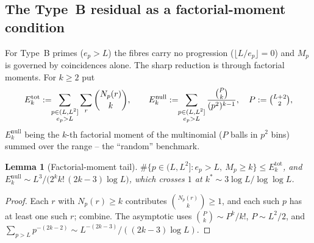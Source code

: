 \documentclass[11pt]{article}
\theoremstyle{plain}
\newtheorem{lemma}[theorem]{Lemma}
\theoremstyle{definition}
\theoremstyle{remark}
\newcommand{\ep}{e_p}
\begin{document}
\subsection{The Type~B residual as a factorial-moment condition}\label{sec:typeB}

For Type~B primes ($\ep>L$) the fibres carry no progression
($\lfloor L/\ep\rfloor=0$) and $M_p$ is governed by coincidences alone. The sharp
reduction is through factorial moments. For $k\ge2$ put
\[
E_k^{\mathrm{tot}}:=\!\!\sum_{\substack{p\in(L,L^2]\\ \ep>L}}\sum_r\binom{N_p(r)}{k},
\qquad
E_k^{\mathrm{null}}:=\!\!\sum_{\substack{p\in(L,L^2]\\ \ep>L}}\frac{\binom{P}{k}}{(p^2)^{k-1}},
\quad P:=\tbinom{L+2}{2},
\]
$E_k^{\mathrm{null}}$ being the $k$-th factorial moment of the multinomial ($P$
balls in $p^2$ bins) summed over the range -- the ``random'' benchmark.

\begin{lemma}[Factorial-moment tail]\label{lem:markov}
$\#\{p\in(L,L^2]:\ep>L,\ M_p\ge k\}\le E_k^{\mathrm{tot}}$, and
$E_k^{\mathrm{null}}\sim L^3/\bigl(2^kk!\,(2k-3)\log L\bigr)$, which crosses $1$ at
$k^\ast\sim3\log L/\log\log L$.
\end{lemma}
\begin{proof}
Each $r$ with $N_p(r)\ge k$ contributes $\binom{N_p(r)}{k}\ge1$, and each such
$p$ has at least one such $r$; combine. The asymptotic uses
$\binom{P}{k}\sim P^k/k!$, $P\sim L^2/2$, and
$\sum_{p>L}p^{-(2k-2)}\sim L^{-(2k-3)}/((2k-3)\log L)$.
\end{proof}
\end{document}
